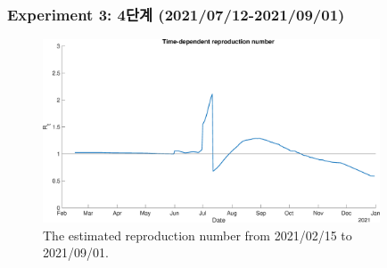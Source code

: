 \documentclass[aspectratio=169, 9pt, xcolor=dvipsnames]{beamer}
\begin{document}
	\begin{frame}\frametitle{Experiment 3: 4단계 (2021/07/12-2021/09/01)}
	    \begin{figure}
	    	\centering
	    	\includegraphics[width=10cm]{../results/predict_exp_3_sd3_same_school_same/rep_num.eps}
	    	\caption{The estimated reproduction number from 2021/02/15 to 2021/09/01.}
	    \end{figure}
	\end{frame}
\end{document}
